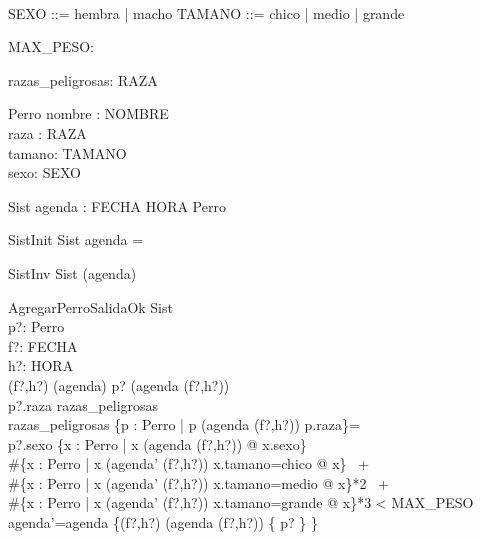 \begin{zed}
 \\
\also
SEXO ::= hembra | macho
\also
TAMANO ::= chico | medio | grande
\end{zed}


\begin{axdef}
MAX\_PESO: \nat
\end{axdef}

\begin{axdef}
razas\_peligrosas: \power RAZA \\
\end{axdef}

\begin{schema}{Perro}
    nombre : NOMBRE\\
    raza : RAZA \\
    tamano: TAMANO \\
    sexo: SEXO 
\end{schema}


\begin{schema}{Sist}
    agenda : FECHA \cross HORA \pfun \power Perro \\
\end{schema}

\begin{schema}{SistInit}
Sist
\where
agenda = \emptyset \\
\end{schema}

\begin{schema}{SistInv}
Sist
\where
\emptyset \notin (\ran agenda) \\
\end{schema}

\begin{schema}{AgregarPerroSalidaOk}
\Delta Sist \\
p?: Perro \\
f?: FECHA \\
h?: HORA \\
\where
(f?,h?) \in (\dom agenda) \land p? \notin (agenda (f?,h?)) \\
p?.raza \notin razas\_peligrosas \lor \\ razas\_peligrosas \cap \{p : Perro | p \in (agenda (f?,h?)) \spot p.raza\}=\emptyset \\
p?.sexo \in \{x : Perro | x \in (agenda (f?,h?)) @ x.sexo\}\\
\#\{x : Perro | x \in (agenda' (f?,h?)) \land x.tamano=chico @ x\} \ + \\
\#\{x : Perro | x \in (agenda' (f?,h?)) \land  x.tamano=medio @ x\}*2 \ + \\
\#\{x : Perro | x \in (agenda' (f?,h?)) \land  x.tamano=grande @ x\}*3 < MAX\_PESO \\
agenda'=agenda \oplus \{(f?,h?) \mapsto (agenda (f?,h?)) \cup \{ p? \} \}  \\
\end{schema}

